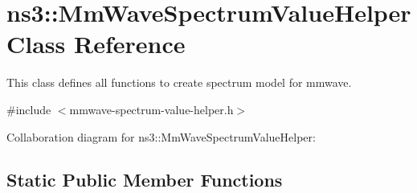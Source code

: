 \hypertarget{classns3_1_1MmWaveSpectrumValueHelper}{}\section{ns3\+:\+:Mm\+Wave\+Spectrum\+Value\+Helper Class Reference}
\label{classns3_1_1MmWaveSpectrumValueHelper}


This class defines all functions to create spectrum model for mmwave.  




{\ttfamily \#include $<$mmwave-\/spectrum-\/value-\/helper.\+h$>$}



Collaboration diagram for ns3\+:\+:Mm\+Wave\+Spectrum\+Value\+Helper\+:
\subsection*{Static Public Member Functions}
